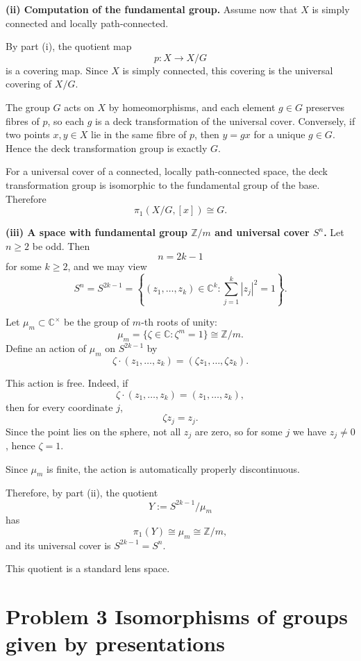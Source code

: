 \documentclass[12pt,a4paper]{article}
\theoremstyle{notespace}
\begin{document}
\textbf{(ii) Computation of the fundamental group.}
Assume now that \(X\) is simply connected and locally path-connected.

By part (i), the quotient map
\[
p:X\to X/G
\]
is a covering map. Since \(X\) is simply connected, this covering is the universal covering of \(X/G\).

The group \(G\) acts on \(X\) by homeomorphisms, and each element \(g\in G\) preserves fibres of \(p\), so each \(g\) is a deck transformation of the universal cover. Conversely, if two points \(x,y\in X\) lie in the same fibre of \(p\), then \(y=gx\) for a unique \(g\in G\). Hence the deck transformation group is exactly \(G\).

For a universal cover of a connected, locally path-connected space, the deck transformation group is isomorphic to the fundamental group of the base. Therefore
\[
\pi_1(X/G,[x])\cong G.
\]

\textbf{(iii) A space with fundamental group \(\mathbb{Z}/m\) and universal cover \(S^n\).}
Let \(n\ge 2\) be odd. Then
\[
n=2k-1
\]
for some \(k\ge 2\), and we may view
\[
S^n=S^{2k-1}=\left\{(z_1,\dots,z_k)\in \mathbb{C}^k:\sum_{j=1}^k |z_j|^2=1\right\}.
\]

Let \(\mu_m\subset \mathbb{C}^\times\) be the group of \(m\)-th roots of unity:
\[
\mu_m=\{\zeta\in\mathbb{C}:\zeta^m=1\}\cong \mathbb{Z}/m.
\]
Define an action of \(\mu_m\) on \(S^{2k-1}\) by
\[
\zeta\cdot (z_1,\dots,z_k)=(\zeta z_1,\dots,\zeta z_k).
\]

This action is free. Indeed, if
\[
\zeta\cdot (z_1,\dots,z_k)=(z_1,\dots,z_k),
\]
then for every coordinate \(j\),
\[
\zeta z_j=z_j.
\]
Since the point lies on the sphere, not all \(z_j\) are zero, so for some \(j\) we have \(z_j\neq 0\), hence \(\zeta=1\).

Since \(\mu_m\) is finite, the action is automatically properly discontinuous.

Therefore, by part (ii), the quotient
\[
Y:=S^{2k-1}/\mu_m
\]
has
\[
\pi_1(Y)\cong \mu_m\cong \mathbb{Z}/m,
\]
and its universal cover is \(S^{2k-1}=S^n\).

This quotient is a standard lens space.


\section{Problem 3 Isomorphisms of groups given by presentations}
\end{document}
